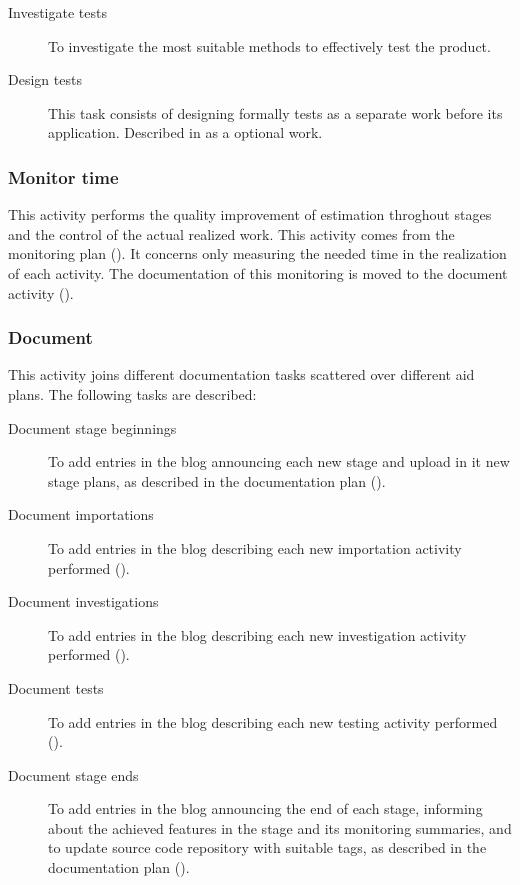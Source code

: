 \documentclass[twocolumn, 9pt]{extarticle}
\begin{document}
\begin{description}
  \item[Investigate tests] To investigate the most suitable methods to
    effectively test the product.
  \item[Design tests] This task consists of designing formally tests
    as a separate work before its application. Described in
     as a optional work.
\end{description}

\subsubsection{Monitor time}
\label{sssec:monitor-time}
This activity performs the quality improvement of estimation
throghout stages and the control of the actual realized work. This
activity comes from the monitoring plan
(). It concerns only measuring the
needed time in the realization of each activity. The documentation of
this monitoring is moved to the document activity
().

\subsubsection{Document}
\label{sssec:document}
This activity joins different documentation tasks scattered over
different aid plans. The following tasks are described:

\begin{description}
  \item[Document stage beginnings] To add entries in the \favp blog
    announcing each new stage and upload in it new stage plans, as
    described in the documentation plan ().
  \item[Document importations] To add entries in the \favp blog
    describing each new importation activity performed
    ().
  \item[Document investigations] To add entries in the \favp blog describing
    each new investigation activity performed ().
  \item[Document tests] To add entries in the \favp blog describing
    each new testing activity performed
    ().
  \item[Document stage ends] To add entries in the \favp blog
    announcing the end of each stage, informing about the achieved
    features in the stage and its monitoring summaries, and to update
    source code repository with suitable tags, as described in the
    documentation plan
    ().
\end{description}
\end{document}
